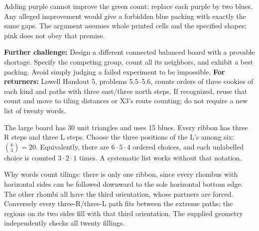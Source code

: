 \documentclass[11pt]{article}
\begin{document}
Adding purple cannot improve the green count: replace each purple by two blues. Any alleged improvement would give a forbidden blue packing with exactly the same gaps. The argument assumes whole printed cells and the specified shapes; pink does not obey that premise.

\textbf{Further challenge:} Design a different connected balanced board with a provable shortage. Specify the competing group, count all its neighbors, and exhibit a best packing. Avoid simply judging a failed experiment to be impossible.
\newpage
{}
\textbf{For returners:} Lowell Handout 5, problems 5.5--5.6, counts orders of three cookies of each kind and paths with three east/three north steps. If recognized, reuse that count and move to tiling distances or X3's route counting; do not require a new list of twenty words.

The large board has 30 unit triangles and uses 15 blues. Every ribbon has three R steps and three L steps. Choose the three positions of the L's among six: \(\binom63=20\). Equivalently, there are \(6\cdot5\cdot4\) ordered choices, and each unlabelled choice is counted \(3\cdot2\cdot1\) times. A systematic list works without that notation.

Why words count tilings: there is only one ribbon, since every rhombus with horizontal sides can be followed downward to the sole horizontal bottom edge. The other rhombi all have the third orientation, whose partners are forced. Conversely every three-R/three-L path fits between the extreme paths; the regions on its two sides fill with that third orientation. The supplied geometry independently checks all twenty fillings.
\end{document}
